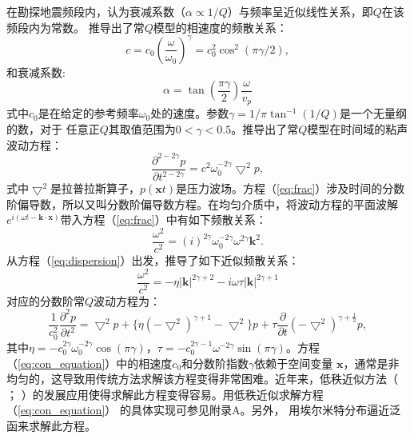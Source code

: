 在勘探地震频段内，认为衰减系数（$\alpha\propto 1/Q$）与频率呈近似线性关系，即$Q$在该频段内为常数。
 推导出了常$Q$模型的相速度的频散关系：
\begin{equation}
	c=c_0(\frac{\omega}{\omega_0})^\gamma=c_0^2\cos^2(\pi\gamma/2),
\end{equation}
和衰减系数:
\begin{equation}
	\alpha=\tan(\frac{\pi\gamma}{2})\frac{\omega}{v_p}
\end{equation}
式中$c_0$是在给定的参考频率$\omega_0$处的速度。参数$\gamma=1/\pi\tan^{-1}(1/Q)$是一个无量纲的数，对于
任意正$Q$其取值范围为$0<\gamma<0.5$。推导出了常$Q$模型在时间域的粘声波动方程：
\begin{equation}
	\frac{\partial^{2-2\gamma}p}{\partial t^{2-2\gamma}}=c^2\omega_0^{-2\gamma}\bigtriangledown^2p,
	\label{eq:frac}
\end{equation}
式中$\bigtriangledown^2$是拉普拉斯算子，$p(\mathbf{x}t)$是压力波场。方程（\ref{eq:frac}）涉及时间的分数
阶偏导数，所以又叫分数阶偏导数方程。在均匀介质中，将波动方程的平面波解
$e^{i(\omega t-\mathbf{k}\cdot\mathbf{x})}$带入方程（\ref{eq:frac}）中有如下频散关系：
\begin{equation}
	\frac{\omega^2}{c^2}=(i)^{2\gamma}\omega_0^{-2\gamma}\omega^{2\gamma}\mathbf{k}^2.
	\label{eq:dispersion}
\end{equation}
 从方程（\ref{eq:dispersion}）出发，推导了如下近似频散关系：
\begin{equation}
	\frac{\omega^2}{c^2}=-\eta|\mathbf{k}|^{2\gamma+2}-i\omega\tau|\mathbf{k}|^{2\gamma+1}
	\label{eq:dispersion1}
\end{equation}
对应的分数阶常$Q$波动方程为：
\begin{equation}
	\frac{1}{c_0^2}\frac{\partial^2p}{\partial t^2}=\bigtriangledown^2p + \{\eta(-\bigtriangledown^2)^
	{\gamma+1}-\bigtriangledown^2\}p + \tau\frac{\partial}{\partial t}(-\bigtriangledown^2)^{\gamma+
	\frac{1}{2}}p,
	\label{eq:con_equation}
\end{equation}
其中$\eta=-c_0^{2\gamma}\omega_0^{-2\gamma}\cos(\pi\gamma)$，$\tau=-c_0^{2\gamma-1}\omega^{-2\gamma}
\sin(\pi\gamma)$。方程（\ref{eq:con_equation}）中的相速度$c_0$和分数阶指数$\gamma$依赖于空间变量
$\mathbf{x}$，通常是非均匀的，这导致用传统方法求解该方程变得非常困难。近年来，低秩近似方法（ 
； ）的发展应用使得求解此方程变得容易。用低秩近似求解方程（\ref{eq:con_equation}）
的具体实现可参见附录A。另外， 用埃尔米特分布逼近泛函来求解此方程。


